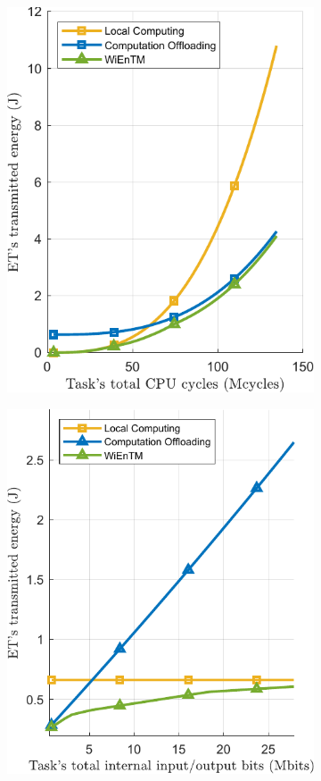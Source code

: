 \documentclass[12pt,draftclsnofoot,onecolumn]{IEEEtran}
\begin{document}
\begin{enumerate}
\begin{figure}
	\centering
	\begin{subfigure}[b]{.24\textwidth}
		\centering
		\includegraphics[height=1.2\linewidth]{simulation3_a.pdf}
		\caption{} \label{fig:10a}
	\end{subfigure}
	\begin{subfigure}[b]{.24\textwidth}
		\centering
		\includegraphics[height=1.2\linewidth]{simulation3_b.pdf}

\end{subfigure}
\end{figure}
\end{enumerate}
\end{document}
